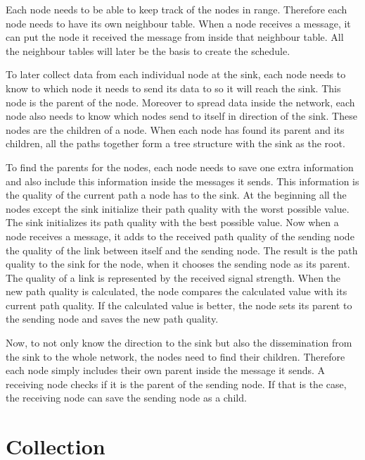 Each node needs to be able to keep track of the nodes in range. Therefore each node needs to have its own neighbour table. When a node receives a message, it can put the node it received the message from inside that neighbour table. All the neighbour tables will later be the basis to create the schedule.

To later collect data from each individual node at the sink, each node needs to know to which node it needs to send its data to so it will reach the sink. This node is the parent of the node. Moreover to spread data inside the network, each node also needs to know which nodes send to itself in direction of the sink. These nodes are the children of a node. When each node has found its parent and its children, all the paths together form a tree structure with the sink as the root.

To find the parents for the nodes, each node needs to save one extra information and also include this information inside the messages it sends. This information is the quality of the current path a node has to the sink. At the beginning all the nodes except the sink initialize their path quality with the worst possible value. The sink initializes its path quality with the best possible value. Now when a node receives a message, it adds to the received path quality of the sending node the quality of the link between itself and the sending node. The result is the path quality to the sink for the node, when it chooses the sending node as its parent. The quality of a link is represented by the received signal strength. When the new path quality is calculated, the node compares the calculated value with its current path quality. If the calculated value is better, the node sets its parent to the sending node and saves the new path quality. 

Now, to not only know the direction to the sink but also the dissemination from the sink to the whole network, the nodes need to find their children. Therefore each node simply includes their own parent inside the message it sends. A receiving node checks if it is the parent of the sending node. If that is the case, the receiving node can save the sending node as a child.       

\section{Collection}
\label{chp:apr_collection}

